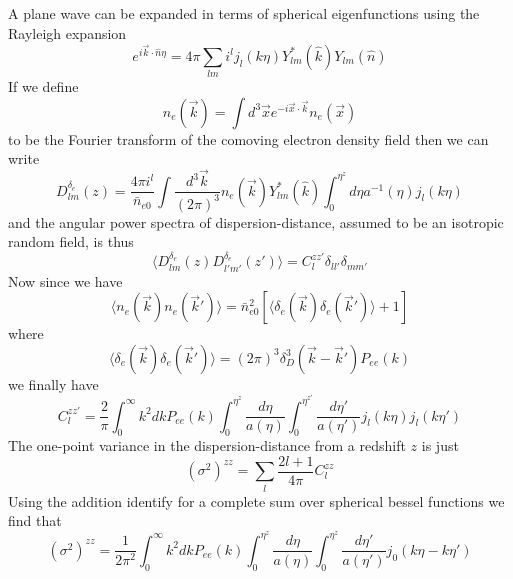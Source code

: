 \documentclass[onecolumn,prd,noshowpacs,nofootinbib,amsmath,amssymb]{revtex4}
\begin{document}
A plane wave can be expanded in terms of spherical eigenfunctions using the Rayleigh expansion
\begin{equation}
e^{i \vec{k}\cdot \hat{n} \eta} = 4\pi \sum_{l m} i^l j_{l}(k\eta) Y^*_{lm}(\hat{k})Y_{lm}(\hat{n})
\end{equation}
If we define 
\begin{equation}
n_e(\vec{k}) = \int d^3 \vec{x} e^{-i \vec{x}\cdot\vec{k}} n_e(\vec{x})
\end{equation}
to be the Fourier transform of the comoving electron density field then we can write
\begin{equation}
    D^{\delta_e}_{l m}(z) = \frac{4 \pi i^{l}}{\bar{n}_{e0}} \int \frac{d^3
    \vec{k}}{(2\pi)^3} n_e(\vec{k}) Y^*_{l m}(\hat{k}) \int_0^{\eta^z} d\eta a^{-1}(\eta) j_{l}(k\eta)
\end{equation}
and the angular power spectra of dispersion-distance, assumed to be an isotropic random field, is thus
\begin{equation}
    \langle D^{\delta_e}_{l m}(z) D^{\delta_e}_{l' m'}(z') \rangle = C_l^{z z'} \delta_{l l'} \delta_{m m'}
\end{equation}
Now since we have 
\begin{equation}
\langle n_e(\vec{k}) n_e(\vec{k}')\rangle = \bar{n}_{e0}^2\left[\langle \delta_e(\vec{k})\delta_e(\vec{k}')\rangle + 1 \right]
\end{equation}
where
\begin{equation}
\langle \delta_e(\vec{k})\delta_e(\vec{k}')\rangle = (2\pi)^3 \delta_{D}^3(\vec{k}-\vec{k}') P_{ee}(k)
\end{equation}
we finally have
\begin{equation}
C_l^{zz'}=\frac{2}{\pi} \int_0^{\infty}k^2 dk P_{ee}(k) \int_0^{\eta^z}\frac{d\eta}{a(\eta)} \int_0^{\eta^{z'}}\frac{d\eta'}{a(\eta')}  j_l(k\eta) j_l(k\eta')
\end{equation}
The one-point variance in the dispersion-distance from a redshift $z$ is just
\begin{equation}
(\sigma^2)^{zz}=\sum_{l} \frac{2l+1}{4\pi} C_l^{zz}
\end{equation}
Using the addition identify for a complete sum over spherical bessel functions we find that
\begin{equation}
(\sigma^2)^{zz}= \frac{1}{2\pi^2} \int_0^{\infty}k^2 dk P_{ee}(k) \int_0^{\eta^z}\frac{d\eta}{a(\eta)} \int_0^{\eta^{z}}\frac{d\eta'}{a(\eta')}  j_0(k\eta-k\eta')
\end{equation}
\end{document}
